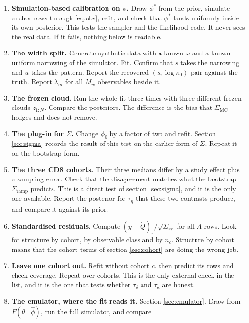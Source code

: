\documentclass[11pt]{article}
\begin{document}
\begin{enumerate}
\item \textbf{Simulation-based calibration on $\phi$.} Draw $\phi^*$ from the
      prior, simulate anchor rows through \eqref{eq:obs}, refit, and check that
      $\phi^*$ lands uniformly inside its own posterior. This tests the sampler
      and the likelihood code. It never sees the real data. If it fails, nothing
      below is readable.
\item \textbf{The width split.} Generate synthetic data with a known $\omega$ and
      a known uniform narrowing of the simulator. Fit. Confirm that $s$ takes the
      narrowing and $u$ takes the pattern. Report the recovered
      $(s,\log\kappa_0)$ pair against the truth. Report $\lambda_m$ for all $M_w$
      observables beside it.
\item \textbf{The frozen cloud.} Run the whole fit three times with three
      different frozen clouds $z_{1:N}$. Compare the posteriors. The difference
      is the bias that $\Sigma_{\text{MC}}$ hedges and does not remove.
\item \textbf{The plug-in for $\Sigma$.} Change $\phi_0$ by a factor of two and
      refit. Section \ref{sec:sigma} records the result of this test on the
      earlier form of $\Sigma$. Repeat it on the bootstrap form.
\item \textbf{The three CD8 cohorts.} Their three medians differ by a study
      effect plus a sampling error. Check that the disagreement matches what the
      bootstrap $\Sigma_{\text{samp}}$ predicts. This is a direct test of section
      \ref{sec:sigma}, and it is the only one available. Report the posterior
      for $\tau_\eta$ that these two contrasts produce, and compare it against
      its prior.
\item \textbf{Standardised residuals.} Compute $(y-\widetilde
      Q)_r/\sqrt{\Sigma_{rr}}$ for all $A$ rows. Look for structure by cohort, by
      observable class and by $n_c$. Structure by cohort means that the cohort
      terms of section \ref{sec:cohort} are doing the wrong job.
\item \textbf{Leave one cohort out.} Refit without cohort $c$, then predict its
      rows and check coverage. Repeat over cohorts. This is the only external
      check in the list, and it is the one that tests whether $\tau_\delta$ and
      $\tau_\kappa$ are honest.
\item \textbf{The emulator, where the fit reads it.} Section \ref{sec:emulator}.
      Draw from $F(\theta\mid\hat\phi)$, run the full simulator, and compare

\end{enumerate}
\end{document}
